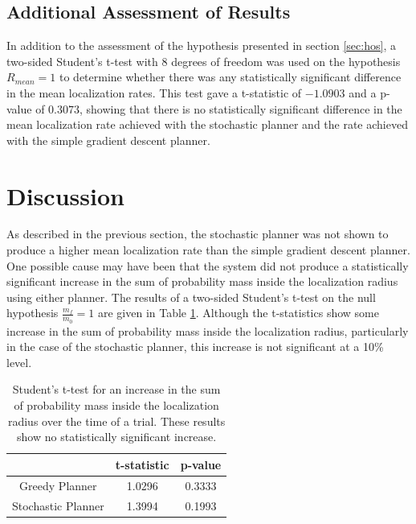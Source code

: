 \documentclass[submit, 12pt]{aiaa-pretty-modified}
\begin{document}
\subsection{Additional Assessment of Results}
\label{sec:additional}
In addition to the assessment of the hypothesis presented in section \ref{sec:hos}, a two-sided Student's
t-test with 8 degrees of freedom was used on the hypothesis $R_{mean}
= 1$ to determine whether there was any statistically significant
difference in the mean localization rates.  This test gave
a t-statistic of $-1.0903$ and a p-value of $0.3073$, showing that
there is no statistically significant difference in the mean localization
rate achieved with the stochastic planner and the rate achieved with
the simple gradient descent planner.

\section{Discussion}
As described in the previous section, the stochastic planner was not
shown to produce a higher mean localization
rate than the simple gradient descent planner.  One possible cause may
have been
that the system did not produce a statistically significant increase
in the sum of probability mass inside the localization radius using
either planner.  The results of a two-sided Student's t-test on the
null hypothesis $\frac{m_f}{m_0} = 1$ are given in Table
\ref{tab:nofind}.  Although the t-statistics show some increase in the
sum of probability mass inside the localization radius,
particularly in the case of the stochastic planner, this increase is
not significant at a 10\% level.

\begin{table}[htb]
\begin{center}
\begin{tabular}{|c||c|c|}
\hline
& t-statistic & p-value \\
\hline \hline
Greedy Planner & 1.0296 & 0.3333\\
\hline
Stochastic Planner& 1.3994 &0.1993\\
\hline
\end{tabular}
\caption[Student's t-test on probability mass increase inside
localization radius.]{Student's t-test for an increase in the sum of probability
  mass inside the localization radius over the time of a trial.
  These results show no statistically significant increase.}
\label{tab:nofind}
\end{center}
\end{table}
\end{document}
